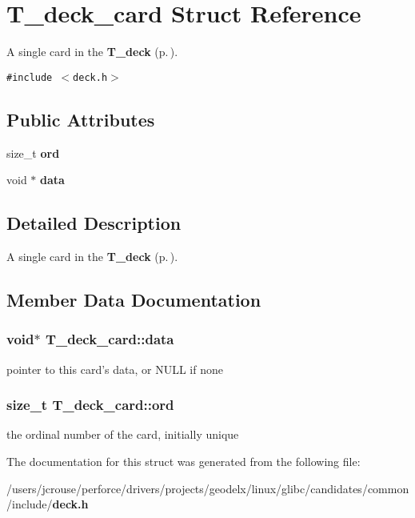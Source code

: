 \section{T\_\-deck\_\-card Struct Reference}
\label{structT__deck__card}
A single card in the {\bf T\_\-deck} {\rm (p.\,\pageref{structT__deck})}. 


{\tt \#include $<$deck.h$>$}

\subsection*{Public Attributes}
\begin{CompactItemize}
\item 
size\_\-t {\bf ord}
\item 
void $\ast$ {\bf data}
\end{CompactItemize}


\subsection{Detailed Description}
A single card in the {\bf T\_\-deck} {\rm (p.\,\pageref{structT__deck})}.



\subsection{Member Data Documentation}
\subsubsection{\setlength{\rightskip}{0pt plus 5cm}void$\ast$ T\_\-deck\_\-card::data}\label{structT__deck__card_m1}


pointer to this card's data, or NULL if none 
\subsubsection{\setlength{\rightskip}{0pt plus 5cm}size\_\-t T\_\-deck\_\-card::ord}\label{structT__deck__card_m0}


the ordinal number of the card, initially unique 

The documentation for this struct was generated from the following file:\begin{CompactItemize}
\item 
/users/jcrouse/perforce/drivers/projects/geodelx/linux/glibc/candidates/common/include/{\bf deck.h}\end{CompactItemize}
